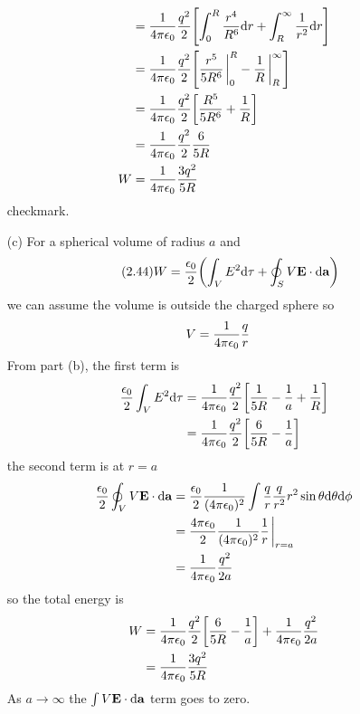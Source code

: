 \documentclass[../main.tex]{subfiles}
\begin{document}
\begin{itemize}
\begin{align*}
        &= \ke \frac{q^2}{2} \qt[\int_0^R \frac{r^4}{R^6} \dd r + \int_R^\infty \frac{1}{r^2} \dd r] \\
        &= \ke \frac{q^2}{2} \qt[\frac{r^5}{5R^6}\eval_0^R - \frac{1}{R}\eval_R^\infty] \\
        &= \ke \frac{q^2}{2} \qt[\frac{R^5}{5R^6} + \frac{1}{R}] \\
        &= \ke \frac{q^2}{2} \frac{6}{5R} \\
        W &= \ke \frac{3q^2}{5R}
    \end{align*}
    checkmark.
    \item[(c)] For a spherical volume of radius $a$ and
    \begin{align*} \tag{2.44} \label{eq:2_44}
        W &= \frac{\epsilon_0}{2} \qt(\int_V E^2 \dd\tau + \oint_S V \vb E \cdot \dd\vb a)
    \end{align*}
    we can assume the volume is outside the charged sphere so
    \begin{align*}
        V &= \frac{1}{4\pi\epsilon_0} \frac{q}{r}
    \end{align*}
    From part (b), the first term is
    \begin{align*}
        \frac{\epsilon_0}{2} \int_V E^2 \dd\tau &= \ke \frac{q^2}{2} \qt[\frac{1}{5R} - \frac{1}{a} + \frac{1}{R}] \\
        &= \ke \frac{q^2}{2} \qt[\frac{6}{5R} - \frac{1}{a}]
    \end{align*}
    the second term is at $r = a$
    \begin{align*}
        \frac{\epsilon_0}{2} \oint_V V \vb E \cdot \dd\vb a &= \frac{\epsilon_0}{2} \frac{1}{(4\pi\epsilon_0)^2} \int \frac{q}{r} \frac{q}{r^2} r^2 \sin\theta \dd \theta \dd\phi \\
        &= \frac{4\pi\epsilon_0}{2} \frac{1}{(4\pi\epsilon_0)^2} \frac{1}{r} \eval_{r = a} \\
        &= \ke \frac{q^2}{2a}
    \end{align*}
    so the total energy is
    \begin{align*}
        W &= \ke \frac{q^2}{2} \qt[\frac{6}{5R} - \frac{1}{a}] + \ke \frac{q^2}{2a} \\
        &= \ke \frac{3q^2}{5R} 
    \end{align*}
    As $a \to \infty$ the $\int V\vb E \cdot \dd\vb a$ term goes to zero.
\end{itemize}
\end{document}
